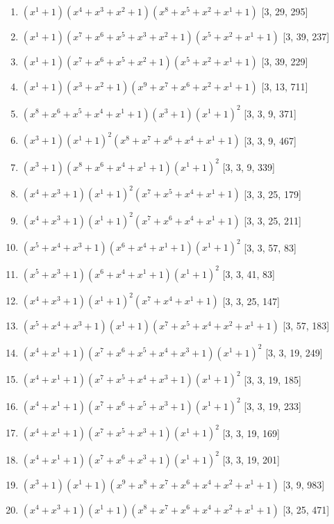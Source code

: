 \documentclass[10pt,twocolumn]{article}
\begin{document}
\begin{enumerate}
\item $(x^{1} + 1)(x^{4} + x^{3} + x^{2} + 1)(x^{8} + x^{5} + x^{2} + x^{1} + 1)$  [3, 29, 295]
\item $(x^{1} + 1)(x^{7} + x^{6} + x^{5} + x^{3} + x^{2} + 1)(x^{5} + x^{2} + x^{1} + 1)$  [3, 39, 237]
\item $(x^{1} + 1)(x^{7} + x^{6} + x^{5} + x^{2} + 1)(x^{5} + x^{2} + x^{1} + 1)$  [3, 39, 229]
\item $(x^{1} + 1)(x^{3} + x^{2} + 1)(x^{9} + x^{7} + x^{6} + x^{2} + x^{1} + 1)$  [3, 13, 711]
\item $(x^{8} + x^{6} + x^{5} + x^{4} + x^{1} + 1)(x^{3} + 1)(x^{1} + 1)^{2}$  [3, 3, 9, 371]
\item $(x^{3} + 1)(x^{1} + 1)^{2}(x^{8} + x^{7} + x^{6} + x^{4} + x^{1} + 1)$  [3, 3, 9, 467]
\item $(x^{3} + 1)(x^{8} + x^{6} + x^{4} + x^{1} + 1)(x^{1} + 1)^{2}$  [3, 3, 9, 339]
\item $(x^{4} + x^{3} + 1)(x^{1} + 1)^{2}(x^{7} + x^{5} + x^{4} + x^{1} + 1)$  [3, 3, 25, 179]
\item $(x^{4} + x^{3} + 1)(x^{1} + 1)^{2}(x^{7} + x^{6} + x^{4} + x^{1} + 1)$  [3, 3, 25, 211]
\item $(x^{5} + x^{4} + x^{3} + 1)(x^{6} + x^{4} + x^{1} + 1)(x^{1} + 1)^{2}$  [3, 3, 57, 83]
\item $(x^{5} + x^{3} + 1)(x^{6} + x^{4} + x^{1} + 1)(x^{1} + 1)^{2}$  [3, 3, 41, 83]
\item $(x^{4} + x^{3} + 1)(x^{1} + 1)^{2}(x^{7} + x^{4} + x^{1} + 1)$  [3, 3, 25, 147]
\item $(x^{5} + x^{4} + x^{3} + 1)(x^{1} + 1)(x^{7} + x^{5} + x^{4} + x^{2} + x^{1} + 1)$  [3, 57, 183]
\item $(x^{4} + x^{1} + 1)(x^{7} + x^{6} + x^{5} + x^{4} + x^{3} + 1)(x^{1} + 1)^{2}$  [3, 3, 19, 249]
\item $(x^{4} + x^{1} + 1)(x^{7} + x^{5} + x^{4} + x^{3} + 1)(x^{1} + 1)^{2}$  [3, 3, 19, 185]
\item $(x^{4} + x^{1} + 1)(x^{7} + x^{6} + x^{5} + x^{3} + 1)(x^{1} + 1)^{2}$  [3, 3, 19, 233]
\item $(x^{4} + x^{1} + 1)(x^{7} + x^{5} + x^{3} + 1)(x^{1} + 1)^{2}$  [3, 3, 19, 169]
\item $(x^{4} + x^{1} + 1)(x^{7} + x^{6} + x^{3} + 1)(x^{1} + 1)^{2}$  [3, 3, 19, 201]
\item $(x^{3} + 1)(x^{1} + 1)(x^{9} + x^{8} + x^{7} + x^{6} + x^{4} + x^{2} + x^{1} + 1)$  [3, 9, 983]
\item $(x^{4} + x^{3} + 1)(x^{1} + 1)(x^{8} + x^{7} + x^{6} + x^{4} + x^{2} + x^{1} + 1)$  [3, 25, 471]

\end{enumerate}
\end{document}
